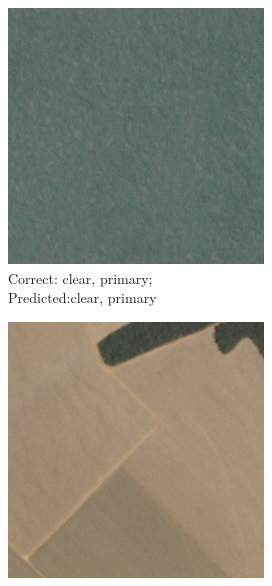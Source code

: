 \documentclass[10pt,twocolumn,letterpaper]{article}
\begin{document}
\begin{figure}[h]
\begin{subfigure}{0.5\columnwidth}
\includegraphics[width=0.9\columnwidth]{sample_images/train_0.jpg}
\caption{Correct: clear, primary;\\Predicted:clear, primary }
\label{subfig:all}
\end{subfigure}%
\begin{subfigure}{0.5\columnwidth}
\includegraphics[width=0.9\columnwidth]{sample_images/train_122.jpg}

\end{subfigure}
\end{figure}
\end{document}
